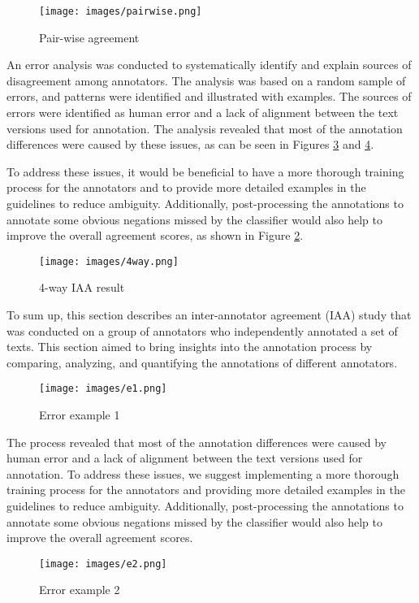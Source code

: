 \begin{figure}
  \texttt{[image: images/pairwise.png]}
  \caption{Pair-wise agreement}
  \label{fig:Pairwise agreement}
\end{figure}


An error analysis was conducted to systematically identify and explain sources of disagreement among annotators. The analysis was based on a random sample of errors, and patterns were identified and illustrated with examples. The sources of errors were identified as human error and a lack of alignment between the text versions used for annotation. The analysis revealed that most of the annotation differences were caused by these issues, as can be seen in Figures \ref{fig:error2} and \ref{fig:error3}.

To address these issues, it would be beneficial to have a more thorough training process for the annotators and to provide more detailed examples in the guidelines to reduce ambiguity. Additionally, post-processing the annotations to annotate some obvious negations missed by the classifier would also help to improve the overall agreement scores, as shown in Figure \ref{fig:4way}.

\begin{figure}[!h]
\begin{center}
  \texttt{[image: images/4way.png]}
  \caption{4-way IAA result}
  \label{fig:4way}
\end{center}  
\end{figure}


To sum up, this section describes an inter-annotator agreement (IAA) study that was conducted on a group of annotators who independently annotated a set of texts. This section aimed to bring insights into the annotation process by comparing, analyzing, and quantifying the annotations of different annotators. 

\begin{figure}[!h]
  \texttt{[image: images/e1.png]}
  \caption{Error example 1}
  \label{fig:error2}
\end{figure}


The process revealed that most of the annotation differences were caused by human error and a lack of alignment between the text versions used for annotation. To address these issues, we suggest implementing a more thorough training process for the annotators and providing more detailed examples in the guidelines to reduce ambiguity. Additionally, post-processing the annotations to annotate some obvious negations missed by the classifier would also help to improve the overall agreement scores.

\begin{figure}[!h]
  \texttt{[image: images/e2.png]}
  \caption{Error example 2} 
  \label{fig:error3}
\end{figure}


